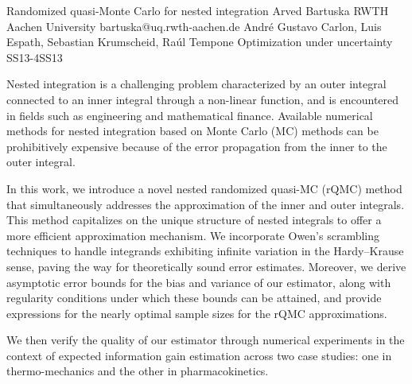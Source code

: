 \begin{talk}
  {Randomized quasi-Monte Carlo for nested integration}%
  {Arved Bartuska}%
  {RWTH Aachen University}%
  {bartuska@uq.rwth-aachen.de}%
  {Andr\'{e} Gustavo Carlon, Luis Espath, Sebastian Krumscheid, Ra\'{u}l Tempone}%
{Optimization under uncertainty}
{}{SS13-4}{SS13}

			
Nested integration is a challenging problem characterized by an outer integral connected to an inner integral through a non-linear function, and is encountered in fields such as engineering and mathematical finance.
Available numerical methods for nested integration based on Monte Carlo (MC) methods can be prohibitively expensive because of the error propagation from the inner to the outer integral.

In this work, we introduce a novel nested randomized quasi-MC (rQMC) method that simultaneously addresses the approximation of the inner and outer integrals. This method capitalizes on the unique structure of nested integrals to offer a more efficient approximation mechanism. We incorporate Owen's scrambling techniques to handle integrands exhibiting infinite variation in the Hardy--Krause sense, paving the way for theoretically sound error estimates. Moreover, we derive asymptotic error bounds for the bias and variance of our estimator, along with regularity conditions under which these bounds can be attained, and provide expressions for the nearly optimal sample sizes for the rQMC approximations.

We then verify the quality of our estimator through numerical experiments in the context of expected information gain estimation across two case studies: one in thermo-mechanics and the other in pharmacokinetics.
\end{talk}

